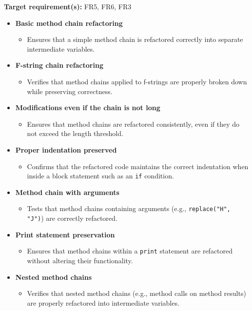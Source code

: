\documentclass[12pt, titlepage]{article}
\begin{document}
  \noindent \textbf{Target requirement(s):} FR5, FR6, FR3 ~\cite{SRS} \\

  \begin{itemize}
    \item \textbf{Basic method chain refactoring}
        \begin{itemize}
            \item Ensures that a simple method chain is refactored correctly into separate intermediate variables.
        \end{itemize}

    \item \textbf{F-string chain refactoring}
        \begin{itemize}
            \item Verifies that method chains applied to f-strings are properly broken down while preserving correctness.
        \end{itemize}
      
    \item \textbf{Modifications even if the chain is not long}
        \begin{itemize}
            \item Ensures that method chains are refactored consistently, even if they do not exceed the length threshold.
        \end{itemize}
      
    \item \textbf{Proper indentation preserved}
        \begin{itemize}
            \item Confirms that the refactored code maintains the correct indentation when inside a block statement such as an \texttt{if} condition.
        \end{itemize}

    \item \textbf{Method chain with arguments}
        \begin{itemize}
            \item Tests that method chains containing arguments (e.g., \texttt{replace("H", "J")}) are correctly refactored.
        \end{itemize}

    \item \textbf{Print statement preservation}
        \begin{itemize}
            \item Ensures that method chains within a \texttt{print} statement are refactored without altering their functionality.
        \end{itemize}
      
    \item \textbf{Nested method chains}
        \begin{itemize}
            \item Verifies that nested method chains (e.g., method calls on method results) are properly refactored into intermediate variables.
        \end{itemize}
  \end{itemize}
\end{document}
